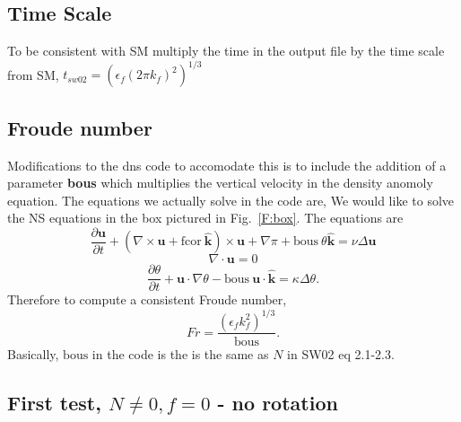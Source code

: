 \documentclass[12pt]{article}
\newcommand{\khat}{\hat{\mathbf k}}
\newcommand{\uv}{\mathbf u}
\newcommand{\grad}{\nabla}
\newcommand{\curl}{\grad \times}
\begin{document}
\subsection*{Time Scale}
To be consistent with SM multiply the time in the output file by the
time scale from SM, $t_{sw02} = (\epsilon_f (2 \pi k_f)^2)^{1/3}$

\subsection*{Froude number}

Modifications to the dns code to accomodate this is to include the
addition of a parameter {\bf{bous}} which multiplies the vertical
velocity in the  density anomoly equation. The equations we actually
solve in the code are,
We would like to solve the NS equations in the box pictured in
Fig.~\ref{F:box}.  The equations are
\[ 
\frac{ \partial  \uv }{\partial t}  + (\curl \uv + \text{fcor} ~\khat) \times \uv
+  
\grad \pi + \text{bous}~ \theta \khat = \nu \Delta \uv 
\] 
\[ 
\grad \cdot \uv = 0 
\] 
\[ 
\frac{ \partial  \theta }{\partial t}  + \uv \cdot \grad \theta -  
\text{bous} ~\uv \cdot \khat = \kappa \Delta \theta.
\] 
Therefore to compute a consistent Froude number,
\begin{equation}
Fr = \frac{(\epsilon_f k_f^2)^{1/3}}{\text{bous}}.
\end{equation}
Basically, $\text{bous}$ in the code is the is the same as $N$ in SW02 eq
2.1-2.3.

\subsection*{First test, $N\ne0, f=0$ - no rotation}
\end{document}
